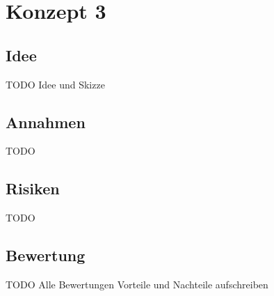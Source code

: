 \section{Konzept 3}

\subsection{Idee}
TODO Idee und Skizze

\subsection{Annahmen}
TODO

\subsection{Risiken}
TODO

\subsection{Bewertung}
TODO Alle Bewertungen
Vorteile und Nachteile aufschreiben